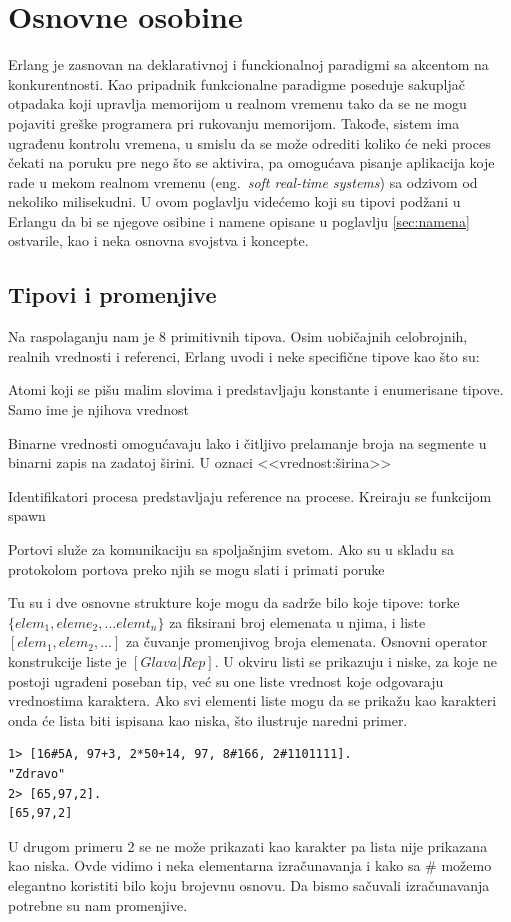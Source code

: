 \documentclass[a4paper]{article}
\begin{document}
{\section{Osnovne osobine}
\label{sec:osobine}
Erlang je zasnovan na deklarativnoj i funckionalnoj paradigmi sa akcentom na konkurentnosti. 
Kao pripadnik funkcionalne paradigme poseduje sakupljač otpadaka 
koji upravlja memorijom u realnom vremenu tako da se ne mogu pojaviti greške programera pri rukovanju memorijom. 
Takođe, sistem ima ugrađenu kontrolu vremena, 
u smislu da se može odrediti koliko će neki proces čekati na poruku pre nego što se aktivira, 
pa omogućava pisanje aplikacija koje rade u mekom realnom vremenu (eng.~{\em soft real-time systems}) sa odzivom od nekoliko milisekudni. 
U ovom poglavlju videćemo koji su tipovi podžani u Erlangu da bi se njegove osibine i namene opisane u poglavlju \ref{sec:namena} ostvarile, 
kao i neka osnovna svojstva i koncepte.



\subsection{Tipovi i promenjive}
Na raspolaganju nam je 8 primitivnih tipova. 
Osim uobičajnih celobrojnih, realnih vrednosti i referenci, Erlang uvodi i neke specifične tipove kao što su:

\begin{list}{•}{}
\item Atomi koji se pišu malim slovima i predstavljaju konstante i enumerisane tipove. Samo ime je njihova vrednost
\item Binarne vrednosti omogućavaju lako i čitljivo prelamanje broja na segmente u binarni zapis na zadatoj širini. U oznaci <<vrednost:širina>>
\item Identifikatori procesa predstavljaju reference na procese. Kreiraju se funkcijom spawn
\item Portovi služe za komunikaciju sa spoljašnjim svetom. Ako su u skladu sa protokolom portova preko njih se mogu slati i primati poruke
\end{list}
 
Tu su i dve osnovne strukture koje mogu da sadrže bilo koje tipove: torke $\{elem_1, eleme_2, ... elemt_n\}$ za fiksirani broj elemenata u njima, 
i liste $[elem_1, elem_2, ...]$ za čuvanje promenjivog broja elemenata. 
Osnovni operator konstrukcije liste je $[Glava | Rep]$. 
U okviru listi se prikazuju i niske, za koje ne postoji ugrađeni poseban tip, 
već su one liste vrednost koje odgovaraju vrednostima karaktera. Ako svi elementi liste mogu da se prikažu kao karakteri onda će lista biti ispisana kao niska, što ilustruje naredni primer.
\begin{verbatim}
1> [16#5A, 97+3, 2*50+14, 97, 8#166, 2#1101111].
"Zdravo"
2> [65,97,2].
[65,97,2]
\end{verbatim}
U drugom primeru 2 se ne može prikazati kao karakter pa lista nije prikazana kao niska. 
Ovde vidimo i neka elementarna izračunavanja i kako sa \# možemo elegantno koristiti bilo koju brojevnu osnovu. Da bismo sačuvali izračunavanja potrebne su nam promenjive.\\

}
\end{document}
